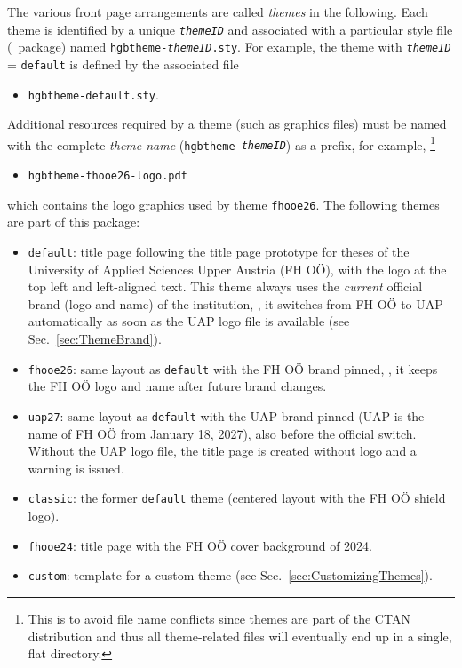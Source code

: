 \documentclass[language=english]{hgbarticle}
\begin{document}
The various front page arrangements are called \emph{themes} in the following.
Each theme is identified by a unique \texttt{\textit{themeID}} and associated with a 
particular style file (\latex\ package) named 
\texttt{hgbtheme-\textit{themeID}.sty}.
For example, the theme with \texttt{\textit{themeID}} = \texttt{default} is defined 
by the associated file
\begin{itemize}
  \item[] \texttt{hgbtheme-default.sty}.
\end{itemize}
%
Additional resources required by a theme (such as graphics files) must be named with the 
complete \emph{theme name} (\texttt{hgbtheme-\textit{themeID}})
as a prefix, for example,%
\footnote{This is to avoid file name conflicts since themes are part of the 
CTAN distribution and thus all theme-related files will eventually end up in a single, 
flat directory.}
\begin{itemize}
	\item[] \texttt{hgbtheme-fhooe26-logo.pdf}
\end{itemize}
%
which contains the logo graphics used by theme \texttt{fhooe26}.
The following themes are part of this package:
%
\begin{itemize}
	\item \texttt{default}: title page following the title page prototype for theses of the
		University of Applied Sciences Upper Austria (FH OÖ), with the logo at the top left
		and left-aligned text. This theme always uses the \emph{current} official brand
		(logo and name) of the institution, \ie, it switches from FH OÖ to UAP automatically
		as soon as the UAP logo file is available (see Sec.~\ref{sec:ThemeBrand}).
	\item \texttt{fhooe26}: same layout as \texttt{default} with the FH OÖ brand pinned, \ie,
		it keeps the FH OÖ logo and name after future brand changes.
	\item \texttt{uap27}: same layout as \texttt{default} with the UAP brand pinned (UAP is the
		name of FH OÖ from January 18, 2027), also before the official switch. Without the
		UAP logo file, the title page is created without logo and a warning is issued.
	\item \texttt{classic}: the former \texttt{default} theme (centered layout with the FH OÖ shield logo).
	\item \texttt{fhooe24}: title page with the FH OÖ cover background of 2024.
	\item \texttt{custom}: template for a custom theme (see Sec.~\ref{sec:CustomizingThemes}).
\end{itemize}
\end{document}
